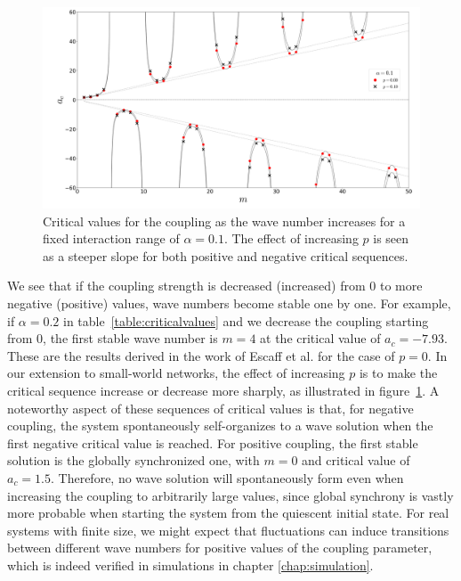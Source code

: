 \begin{figure}
  \centering
  \includegraphics[width=\textwidth]{fig/critical_sequences.png}
  \caption{Critical values for the coupling as the wave number increases for a fixed interaction range of $\alpha=0.1$. The effect of
  increasing $p$ is seen as a steeper slope for both positive and negative critical sequences.}
  \label{fig:criticalsequences}
\end{figure}

\noindent We see that if the coupling strength is decreased (increased) from 0 to more negative (positive) values, wave numbers become
stable one by one. For example, if $\alpha=0.2$ in table~\ref{table:criticalvalues} and we decrease the coupling starting from 0, the
first stable wave number is $m=4$ at the critical value of $a_c=-7.93$. These are the results derived in the work of Escaff et
al.\cite{escaff2014arrays} for the case of $p=0$. In our extension to small-world networks, the effect of increasing $p$ is to make the
critical sequence increase or decrease more sharply, as illustrated in figure~\ref{fig:criticalsequences}. A noteworthy aspect of these
sequences of critical values is that, for negative coupling, the system spontaneously self-organizes to a wave solution when the first
negative critical value is reached. For positive coupling, the first stable solution is the globally synchronized one, with $m=0$ and
critical value of $a_c=1.5$\cite{Wood06a,Wood06b,assis2011infinite,rodrigues2020synchronization}. Therefore, no wave solution will
spontaneously form even when increasing the coupling to arbitrarily large values, since global synchrony is vastly more probable when
starting the system from the quiescent initial state\cite{rodrigues2020synchronization}. For real systems with finite size, we might
expect that fluctuations can induce transitions between different wave numbers for positive values of the coupling parameter, which is
indeed verified in simulations in chapter \ref{chap:simulation}.

